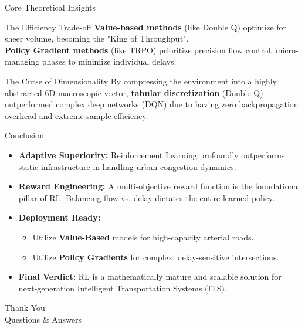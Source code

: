 \documentclass[aspectratio=169]{beamer}
\begin{document}
\begin{frame}{Core Theoretical Insights}
  \begin{block}{The Efficiency Trade-off}
    \textbf{Value-based methods} (like Double Q) optimize for sheer volume, becoming the "King of Throughput". \\
    \textbf{Policy Gradient methods} (like TRPO) prioritize precision flow control, micro-managing phases to minimize individual delays.
  \end{block}
  \vspace{0.4cm}
  \begin{block}{The Curse of Dimensionality}
    By compressing the environment into a highly abstracted 6D macroscopic vector, \textbf{tabular discretization} (Double Q) outperformed complex deep networks (DQN) due to having zero backpropagation overhead and extreme sample efficiency.
  \end{block}
\end{frame}

\begin{frame}{Conclusion}
  \begin{itemize}
    \item \textbf{Adaptive Superiority:} Reinforcement Learning profoundly outperforms static infrastructure in handling urban congestion dynamics.
    \vspace{0.3cm}
    \item \textbf{Reward Engineering:} A multi-objective reward function is the foundational pillar of RL. Balancing flow vs. delay dictates the entire learned policy.
    \vspace{0.3cm}
    \item \textbf{Deployment Ready:} 
    \begin{itemize}
        \item Utilize \textbf{Value-Based} models for high-capacity arterial roads.
        \item Utilize \textbf{Policy Gradients} for complex, delay-sensitive intersections.
    \end{itemize}
    \vspace{0.3cm}
    \item \textbf{Final Verdict:} RL is a mathematically mature and scalable solution for next-generation Intelligent Transportation Systems (ITS).
  \end{itemize}
\end{frame}

\begin{frame}[standout]
  \Huge Thank You \\
  \vspace{0.5cm}
  \large Questions \& Answers
\end{frame}
\end{document}
